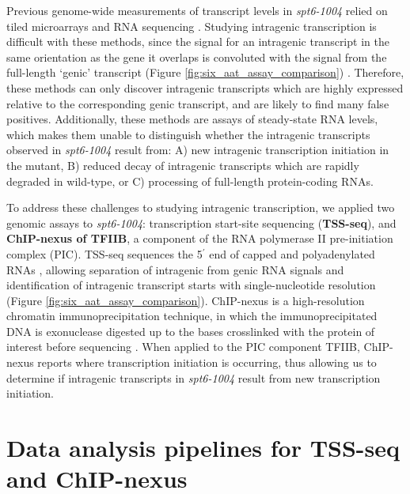 Previous genome-wide measurements of transcript levels in \textit{spt6-1004} relied on tiled microarrays \citep{cheung2008} and RNA sequencing \citep{uwimana2017}.
Studying intragenic transcription is difficult with these methods, since the signal for an intragenic transcript in the same orientation as the gene it overlaps is convoluted with the signal from the full-length `genic' transcript (Figure \ref{fig:six_aat_assay_comparison}) \citep{cheung2008, lickwar2009}. Therefore, these methods can only discover intragenic transcripts which are highly expressed relative to the corresponding genic transcript, and are likely to find many false positives.
Additionally, these methods are assays of steady-state RNA levels, which makes them unable to distinguish whether the intragenic transcripts observed in \textit{spt6-1004} result from: A) new intragenic transcription initiation in the mutant, B) reduced decay of intragenic transcripts which are rapidly degraded in wild-type, or C) processing of full-length protein-coding RNAs.

To address these challenges to studying intragenic transcription, we applied two genomic assays to \textit{spt6-1004}: transcription start-site sequencing (\textbf{TSS-seq}), and \textbf{ChIP-nexus of TFIIB}, a component of the RNA polymerase II pre-initiation complex (PIC).
TSS-seq sequences the 5$^\prime$ end of capped and polyadenylated RNAs \citep{arribere2013, malabat2015}, allowing separation of intragenic from genic RNA signals and identification of intragenic transcript starts with single-nucleotide resolution (Figure \ref{fig:six_aat_assay_comparison}).
ChIP-nexus is a high-resolution chromatin immunoprecipitation technique, in which the immunoprecipitated DNA is exonuclease digested up to the bases crosslinked with the protein of interest before sequencing \citep{he2015}.
When applied to the PIC component TFIIB, ChIP-nexus reports where transcription initiation is occurring, thus allowing us to determine if intragenic transcripts in \textit{spt6-1004} result from new transcription initiation.

\section{Data analysis pipelines for TSS-seq and ChIP-nexus}

